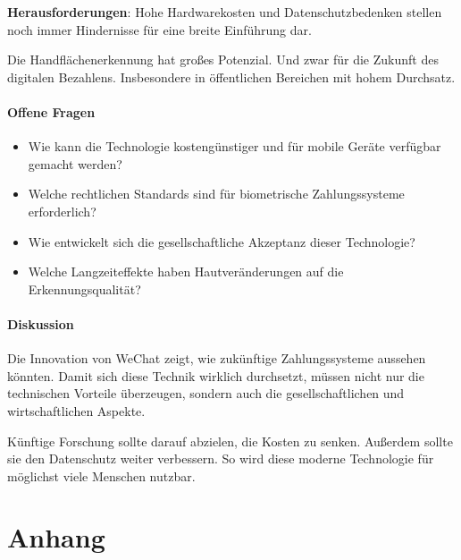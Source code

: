 \documentclass[paper=a4,fontsize=12pt,ngerman]{scrartcl}
\begin{document}
\textbf{Herausforderungen}: Hohe Hardwarekosten und Datenschutzbedenken stellen noch immer Hindernisse für eine breite Einführung dar.

Die Handflächenerkennung hat großes Potenzial. Und zwar für die Zukunft des digitalen Bezahlens. Insbesondere in öffentlichen Bereichen mit hohem Durchsatz.

\vspace{1.5cm}

\subsection{Offene Fragen}
\begin{itemize}
  \item Wie kann die Technologie kostengünstiger und für mobile Geräte verfügbar gemacht werden?
  \item Welche rechtlichen Standards sind für biometrische Zahlungssysteme erforderlich?
  \item Wie entwickelt sich die gesellschaftliche Akzeptanz dieser Technologie?
  \item Welche Langzeiteffekte haben Hautveränderungen auf die Erkennungsqualität?
\end{itemize}

\vspace{1.5cm}

\subsection{Diskussion}
Die Innovation von WeChat zeigt, wie zukünftige Zahlungssysteme aussehen könnten. Damit sich diese Technik wirklich durchsetzt, müssen nicht nur die technischen Vorteile überzeugen, sondern auch die gesellschaftlichen und wirtschaftlichen Aspekte.

Künftige Forschung sollte darauf abzielen, die Kosten zu senken. Außerdem sollte sie den Datenschutz weiter verbessern. So wird diese moderne Technologie für möglichst viele Menschen nutzbar.

\clearpage
\renewcommand\refname{Literaturverzeichnis}




\clearpage
\appendix
\part*{Anhang}
\end{document}
